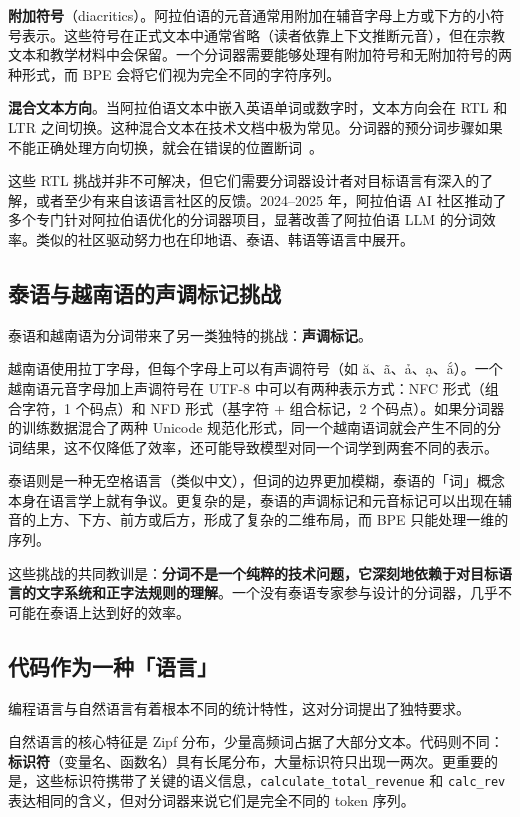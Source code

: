 \textbf{附加符号}（diacritics）。阿拉伯语的元音通常用附加在辅音字母上方或下方的小符号表示。这些符号在正式文本中通常省略（读者依靠上下文推断元音），但在宗教文本和教学材料中会保留。一个分词器需要能够处理有附加符号和无附加符号的两种形式，而 BPE 会将它们视为完全不同的字符序列。

\textbf{混合文本方向}。当阿拉伯语文本中嵌入英语单词或数字时，文本方向会在 RTL 和 LTR 之间切换。这种混合文本在技术文档中极为常见。分词器的预分词步骤如果不能正确处理方向切换，就会在错误的位置断词~\cite{rust2021good}。

这些 RTL 挑战并非不可解决，但它们需要分词器设计者对目标语言有深入的了解，或者至少有来自该语言社区的反馈。2024--2025 年，阿拉伯语 AI 社区推动了多个专门针对阿拉伯语优化的分词器项目，显著改善了阿拉伯语 LLM 的分词效率。类似的社区驱动努力也在印地语、泰语、韩语等语言中展开。

\subsection{泰语与越南语的声调标记挑战}

泰语和越南语为分词带来了另一类独特的挑战：\textbf{声调标记}。

越南语使用拉丁字母，但每个字母上可以有声调符号（如 ă、ã、ả、ạ、ắ）。一个越南语元音字母加上声调符号在 UTF-8 中可以有两种表示方式：NFC 形式（组合字符，1 个码点）和 NFD 形式（基字符 + 组合标记，2 个码点）。如果分词器的训练数据混合了两种 Unicode 规范化形式，同一个越南语词就会产生不同的分词结果，这不仅降低了效率，还可能导致模型对同一个词学到两套不同的表示。

泰语则是一种无空格语言（类似中文），但词的边界更加模糊，泰语的「词」概念本身在语言学上就有争议。更复杂的是，泰语的声调标记和元音标记可以出现在辅音的上方、下方、前方或后方，形成了复杂的二维布局，而 BPE 只能处理一维的序列。

这些挑战的共同教训是：\textbf{分词不是一个纯粹的技术问题，它深刻地依赖于对目标语言的文字系统和正字法规则的理解}。一个没有泰语专家参与设计的分词器，几乎不可能在泰语上达到好的效率。

\subsection{代码作为一种「语言」}

编程语言与自然语言有着根本不同的统计特性，这对分词提出了独特要求。

自然语言的核心特征是 Zipf 分布，少量高频词占据了大部分文本。代码则不同：\textbf{标识符}（变量名、函数名）具有长尾分布，大量标识符只出现一两次。更重要的是，这些标识符携带了关键的语义信息，\texttt{calculate\_total\_revenue} 和 \texttt{calc\_rev} 表达相同的含义，但对分词器来说它们是完全不同的 token 序列。

